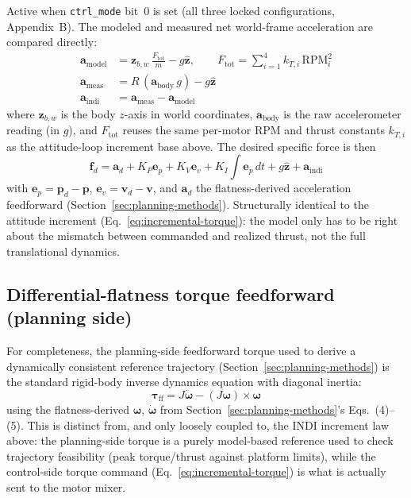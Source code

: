 \documentclass[11pt,a4paper]{article}
\newcommand{\code}[1]{\texttt{#1}}
\begin{document}
Active when \code{ctrl\_mode} bit~0 is set (all three locked configurations, Appendix~B). The
modeled and measured net world-frame acceleration are compared directly:
\begin{align}
  \mathbf{a}_{\mathrm{model}} &= \mathbf{z}_{b,w}\,\frac{F_{\mathrm{tot}}}{m} - g\hat{\mathbf{z}},
    \qquad F_{\mathrm{tot}} = \sum_{i=1}^4 k_{T,i}\,\mathrm{RPM}_i^2 \\
  \mathbf{a}_{\mathrm{meas}} &= R\,(\mathbf{a}_{\mathrm{body}}\,g) - g\hat{\mathbf{z}} \\
  \mathbf{a}_{\mathrm{indi}} &= \mathbf{a}_{\mathrm{meas}} - \mathbf{a}_{\mathrm{model}}
\end{align}
where $\mathbf{z}_{b,w}$ is the body $z$-axis in world coordinates, $\mathbf{a}_{\mathrm{body}}$ is
the raw accelerometer reading (in $g$), and $F_{\mathrm{tot}}$ reuses the same per-motor RPM and
thrust constants $k_{T,i}$ as the attitude-loop increment base above. The desired specific force
is then
\[
  \mathbf{f}_d = \mathbf{a}_d + K_P\mathbf{e}_p + K_V\mathbf{e}_v + K_I\!\!\int\!\mathbf{e}_p\,dt
    + g\hat{\mathbf{z}} + \mathbf{a}_{\mathrm{indi}}
\]
with $\mathbf{e}_p = \mathbf{p}_d - \mathbf{p}$, $\mathbf{e}_v = \mathbf{v}_d - \mathbf{v}$, and
$\mathbf{a}_d$ the flatness-derived acceleration feedforward (Section~\ref{sec:planning-methods}).
Structurally identical to the attitude increment (Eq.~\eqref{eq:incremental-torque}): the model only has to be right about
the mismatch between commanded and realized thrust, not the full translational dynamics.

\subsection{Differential-flatness torque feedforward (planning side)}

For completeness, the planning-side feedforward torque used to derive a dynamically consistent
reference trajectory (Section~\ref{sec:planning-methods}) is the standard rigid-body inverse
dynamics equation with diagonal inertia:
\[
  \boldsymbol{\tau}_{\mathrm{ff}} = J\dot{\boldsymbol{\omega}} - (J\boldsymbol{\omega})\times\boldsymbol{\omega}
\]
using the flatness-derived $\boldsymbol{\omega}$, $\dot{\boldsymbol{\omega}}$ from
Section~\ref{sec:planning-methods}'s Eqs.~(4)--(5). This is distinct from, and only loosely
coupled to, the INDI increment law above: the planning-side torque is a purely model-based
reference used to check trajectory feasibility (peak torque/thrust against platform limits),
while the control-side torque command (Eq.~\eqref{eq:incremental-torque}) is what is actually sent to the motor mixer.
\end{document}
